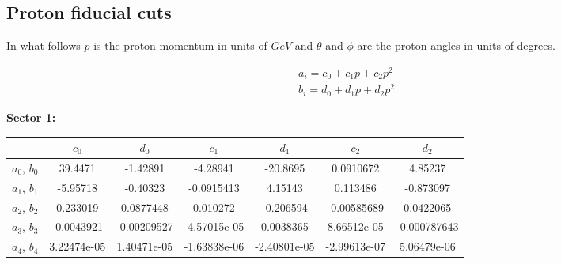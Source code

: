\vspace{0.7cm}
\subsection{Proton fiducial cuts}\label{app:fidu_p}

In what follows $p$ is the proton momentum in units of $GeV$ and $\theta$ and $\phi$ are the
proton angles in units of degrees.


$$
\begin{array}{c}
a_i = c_0 + c_1 p + c_2 p^2 \\
b_i = d_0 + d_1 p + d_2 p^2 
\end{array}
$$

\vspace{0.5cm}


{\bf Sector 1:}

\begin{table}[h]
\scriptsize
 \begin{center}
  \begin{tabular}{c|c|c|c|c|c|c}
    \hline 
    & $c_0$ & $d_0$ & $c_1$ & $d_1$     & $c_2$ & $d_2$ \\
    \hline  
   $a_0$, $b_0$ &   39.4471  & -1.42891 &  -4.28941  & -20.8695  & 0.0910672  & 4.85237  \\
   $a_1$, $b_1$ &    -5.95718 &  -0.40323  & -0.0915413  & 4.15143  & 0.113486  & -0.873097  \\
   $a_2$, $b_2$ &  0.233019  & 0.0877448  & 0.010272  & -0.206594 &  -0.00585689  & 0.0422065  \\  
   $a_3$, $b_3$ &   -0.0043921  & -0.00209527  & -4.57015e-05  & 0.0038365  & 8.66512e-05  & -0.000787643  \\ 
   $a_4$, $b_4$ &  3.22474e-05  & 1.40471e-05  & -1.63838e-06  & -2.40801e-05  & -2.99613e-07  & 5.06479e-06  \\
 \hline
  \end{tabular}
 \end{center} 
\end{table}
\clearpage
\vspace{0.5cm}

